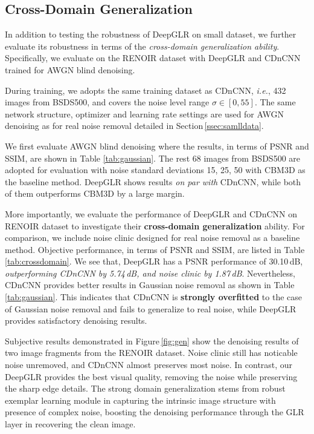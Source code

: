 \documentclass[10pt,twocolumn,letterpaper]{article}
\begin{document}
\subsection{Cross-Domain Generalization}
\label{ssub:cross}
%
In addition to testing the robustness of DeepGLR on small dataset, we further evaluate its robustness in terms of the \emph{cross-domain generalization ability}. 
Specifically, we evaluate on the RENOIR dataset with DeepGLR and CDnCNN trained for AWGN blind denoising. 

During training, we adopts the same training dataset as CDnCNN, \textit{i.e.}, 432 images from BSDS500, and covers the noise level range $\sigma \in [0,55]$. The same network structure, optimizer and learning rate settings are used for AWGN denoising as for real noise removal detailed in Section\,\ref{ssec:samlldata}.

We first evaluate AWGN blind denoising where the results, in terms of PSNR and SSIM, are shown in Table \ref{tab:gaussian}. 
The rest 68 images from BSDS500 are adopted for evaluation with noise standard deviations 15, 25, 50 with CBM3D as the baseline method. DeepGLR shows results \emph{on par with} CDnCNN, while both of them outperforms CBM3D by a large margin.


More importantly, we evaluate the performance of DeepGLR and CDnCNN on RENOIR dataset to investigate their \textbf{cross-domain generalization} ability.
For comparison, we include noise clinic \cite{lebrun2015noise} designed for real noise removal as a baseline method. 
Objective performance, in terms of PSNR and SSIM, are listed in Table\,\ref{tab:crossdomain}.
We see that, DeepGLR has a PSNR performance of 30.10\,dB, \textit{outperforming CDnCNN by 5.74\,dB, and noise clinic by 1.87\,dB}. 
Nevertheless, CDnCNN provides better results in Gaussian noise removal as shown in Table \ref{tab:gaussian}.
This indicates that CDnCNN is \textbf{strongly overfitted} to the case of Gaussian noise removal and fails to generalize to real noise, while DeepGLR provides satisfactory denoising results.

Subjective results demonstrated in Figure\,\ref{fig:gen} show the denoising results of two image fragments from the RENOIR dataset. Noise clinic still has noticable noise unremoved, and CDnCNN almost preserves most noise. 
In contrast, our DeepGLR provides the best visual quality, removing the noise while preserving the sharp edge details. 
The strong domain generalization stems from robust exemplar learning module in capturing the intrinsic image structure with presence of complex noise, boosting the denoising performance through the GLR layer in recovering the clean image.
\end{document}
